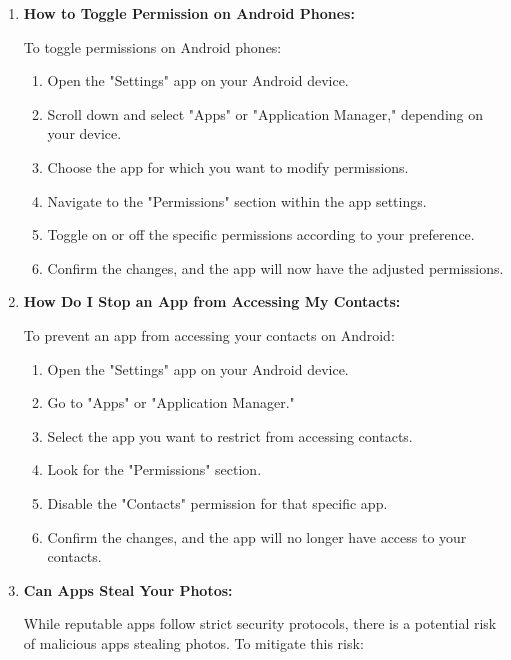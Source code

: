 \documentclass[11pt]{article}
\begin{document}
\begin{enumerate}
    
    \item \textbf{How to Toggle Permission on Android Phones:}
    
    To toggle permissions on Android phones:
    
    \begin{enumerate}
        \item Open the "Settings" app on your Android device.
        \item Scroll down and select "Apps" or "Application Manager," depending on your device.
        \item Choose the app for which you want to modify permissions.
        \item Navigate to the "Permissions" section within the app settings.
        \item Toggle on or off the specific permissions according to your preference.
        \item Confirm the changes, and the app will now have the adjusted permissions.
    \end{enumerate}
    
    \item \textbf{How Do I Stop an App from Accessing My Contacts:}
    
    To prevent an app from accessing your contacts on Android:
    
    \begin{enumerate}
        \item Open the "Settings" app on your Android device.
        \item Go to "Apps" or "Application Manager."
        \item Select the app you want to restrict from accessing contacts.
        \item Look for the "Permissions" section.
        \item Disable the "Contacts" permission for that specific app.
        \item Confirm the changes, and the app will no longer have access to your contacts.
    \end{enumerate}
    
    \item \textbf{Can Apps Steal Your Photos:}
    
    While reputable apps follow strict security protocols, there is a potential risk of malicious apps stealing photos. To mitigate this risk:
    

\end{enumerate}
\end{document}
